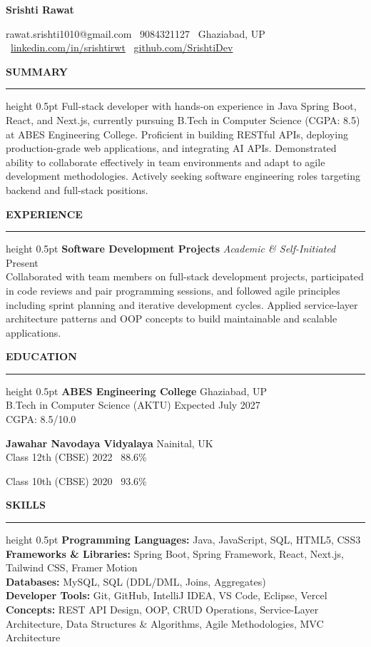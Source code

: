 \documentclass[11pt,a4paper]{article}
\newcommand{\sectionheader}[1]{%
    \par\addtolength{\topsep}{0.5\baselineskip}%
    {\large\textbf{\uppercase{#1}}}\par%
    \nopagebreak\vspace{-1em}\nopagebreak\hrule height 0.5pt\endgraf%
    \nopagebreak\vspace{0.25em}\nopagebreak}
\begin{document}
\vspace{-0.5em}
{\LARGE\textbf{Srishti Rawat}}\par
\vspace{0.25em}

rawat.srishti1010@gmail.com \textbullet\ 9084321127 \textbullet\ Ghaziabad, UP \textbullet\ \href{https://linkedin.com/in/srishtirwt}{linkedin.com/in/srishtirwt} \textbullet\ \href{https://github.com/SrishtiDev}{github.com/SrishtiDev}\par
\vspace{0.5em}

\sectionheader{Summary}
Full-stack developer with hands-on experience in Java Spring Boot, React, and Next.js, currently pursuing B.Tech in Computer Science (CGPA: 8.5) at ABES Engineering College. Proficient in building RESTful APIs, deploying production-grade web applications, and integrating AI APIs. Demonstrated ability to collaborate effectively in team environments and adapt to agile development methodologies. Actively seeking software engineering roles targeting backend and full-stack positions.\par

\sectionheader{Experience}
\textbf{Software Development Projects} \hfill \textit{Academic \& Self-Initiated} \hfill Present\\
Collaborated with team members on full-stack development projects, participated in code reviews and pair programming sessions, and followed agile principles including sprint planning and iterative development cycles. Applied service-layer architecture patterns and OOP concepts to build maintainable and scalable applications.\par

\sectionheader{Education}
\textbf{ABES Engineering College} \hfill Ghaziabad, UP\\
B.Tech in Computer Science (AKTU) \hfill Expected July 2027\\
CGPA: 8.5/10.0\par
\vspace{0.5em}
\textbf{Jawahar Navodaya Vidyalaya} \hfill Nainital, UK\\
Class 12th (CBSE) \hfill 2022 \textbar\ 88.6\%\par
Class 10th (CBSE) \hfill 2020 \textbar\ 93.6\%\par

\sectionheader{Skills}
\textbf{Programming Languages:} Java, JavaScript, SQL, HTML5, CSS3\\
\textbf{Frameworks \& Libraries:} Spring Boot, Spring Framework, React, Next.js, Tailwind CSS, Framer Motion\\
\textbf{Databases:} MySQL, SQL (DDL/DML, Joins, Aggregates)\\
\textbf{Developer Tools:} Git, GitHub, IntelliJ IDEA, VS Code, Eclipse, Vercel\\
\textbf{Concepts:} REST API Design, OOP, CRUD Operations, Service-Layer Architecture, Data Structures \& Algorithms, Agile Methodologies, MVC Architecture\par
\end{document}

